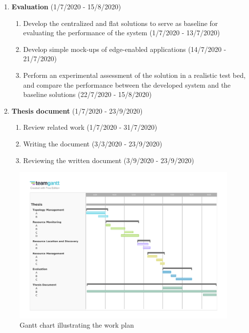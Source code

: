 \begin{enumerate}
\begin{enumerate}
    \end{enumerate}
    \item \textbf{Evaluation} (1/7/2020 - 15/8/2020)
    \begin{enumerate}
        \item Develop the centralized and flat solutions to serve as baseline for evaluating the performance of the system (1/7/2020 - 13/7/2020)
        \item Develop simple mock-ups of edge-enabled applications (14/7/2020 - 21/7/2020)
        \item Perform an experimental assessment of the solution in a realistic test bed, and compare the performance between the developed system and the baseline solutions (22/7/2020 - 15/8/2020)
    \end{enumerate}
    \item \textbf{Thesis document} (1/7/2020 - 23/9/2020)
    \begin{enumerate}
        \item Review related work (1/7/2020 - 31/7/2020)
        \item Writing the document (3/3/2020 - 23/9/2020)
        \item Reviewing the written document (3/9/2020 - 23/9/2020)
    \end{enumerate}
\end{enumerate}


\begin{figure}[hbpt]
    \centering
    \includegraphics[width=0.95\linewidth]{Figures/gantt_chart.pdf}
    \caption{Gantt chart illustrating the work plan}
    \label{fig:gantt_chart}
\end{figure}
